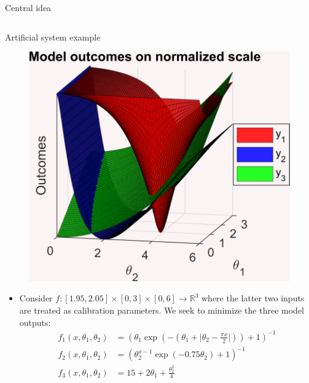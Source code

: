 \documentclass[final]{beamer}
\newlength{\onecolwid}
\newlength{\twocolwid}
\begin{document}
\begin{frame}[t]
\begin{columns}[t]
\begin{column}{\twocolwid}
\begin{alertblock}{Central idea}
\end{alertblock} 


\begin{columns}[t,totalwidth=\twocolwid] %

\begin{column}{\onecolwid}\vspace{-.6in} %


\begin{alertblock}{Artificial system example}


\begin{figure}[h!]
\includegraphics[width=0.6\linewidth]{FIG_toy_sim_model_outputs}
\label{blade}
\end{figure}

\vspace{-10mm}
\begin{itemize}

\item Consider $f:[1.95,2.05]\times[0,3]\times[0,6]\to \mathbb R^3$ where the latter two inputs are treated as calibration parameters. We seek to minimize the three model outputs:
\begin{align*}
f_1(x,\theta_1,\theta_2) &= \left( \theta_1 \exp \left ( - \left( \theta_1 + \lvert \theta_2 - \frac{\pi x}2\rvert \right) \right) + 1 \right)^{-1}\\
f_2(x,\theta_1,\theta_2) &= \left(\theta_2^{x-1} \exp\left(-0.75\theta_2\right)+1\right)^{-1}\\
f_3(x,\theta_1,\theta_2)&=15+2\theta_1+\frac{\theta_2^2}4
\end{align*}


\end{itemize}
\end{alertblock}
\end{column}
\end{columns}
\end{column}
\end{columns}
\end{frame}
\end{document}

